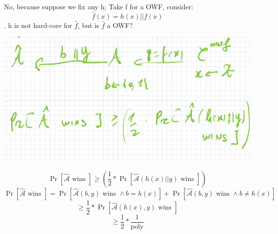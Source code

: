 \documentclass[11pt, a4paper]{article}
\begin{document}
No, because suppose we fix any h; Take f for a OWF, consider:
$$\hat{f}(x) = h(x) || f(x)$$.
h is not hard-core for $\hat{f}$, but is $\hat{f}$ a OWF?\\
\begin{center}
    \includegraphics[scale=0.4]{img/Comp_sec/f_hat1.png}
\end{center}
$$\Pr[\hat{\mathcal{A}} \text{ wins }] \geq (\frac{1}{2} * \Pr[\hat{\mathcal{A}}(h(x) || y) \text{ wins }])$$
$$\Pr[\hat{\mathcal{A}} \text{ wins }] = \Pr[\hat{\mathcal{A}}(b,y) \text{ wins } \wedge b = h(x)] + \Pr[\hat{\mathcal{A}}(b,y) \text{ wins } \wedge b \neq h(x)]$$
$$ \geq \frac{1}{2} * \Pr[\hat{\mathcal{A}}(h(x),y) \text{ wins }]$$
$$ \geq \frac{1}{2} * \frac{1}{\text{poly}}$$
\end{document}
